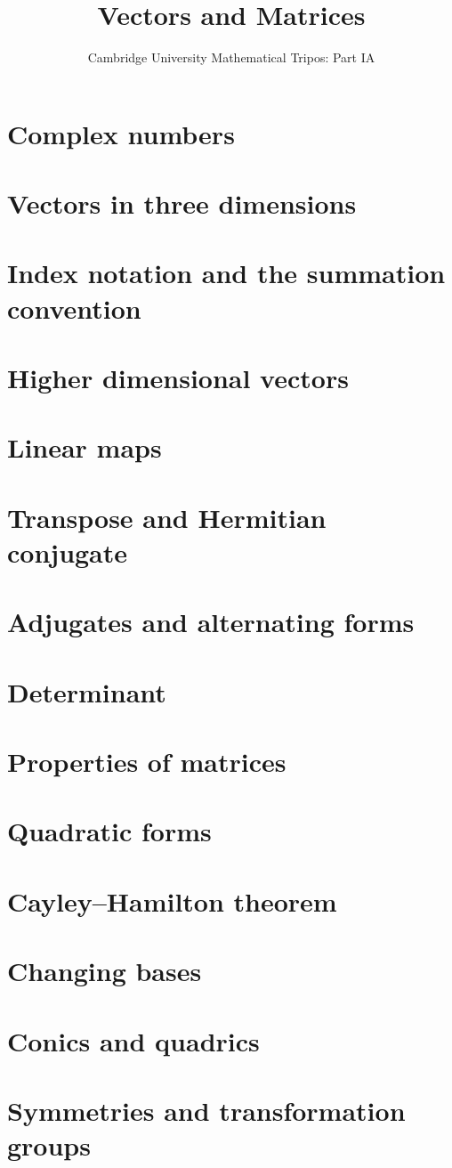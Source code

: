 \documentclass{article}
\title{Vectors and Matrices}
\author{Cambridge University Mathematical Tripos: Part IA}
\begin{document}
\maketitle

\tableofcontentsnewpage{}

\section{Complex numbers}

\section{Vectors in three dimensions}

\section{Index notation and the summation convention}

\section{Higher dimensional vectors}

\section{Linear maps}

\section{Transpose and Hermitian conjugate}

\section{Adjugates and alternating forms}

\section{Determinant}

\section{Properties of matrices}

\section{Quadratic forms}

\section{Cayley--Hamilton theorem}

\section{Changing bases}

\section{Conics and quadrics}

\section{Symmetries and transformation groups}

\end{document}
